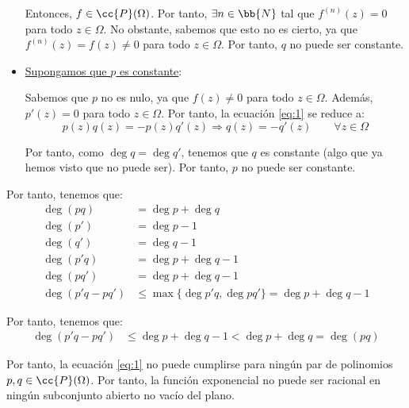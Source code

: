 \begin{ejercicio}
\begin{itemize}
        Entonces, $f\in \cc{P}(\Omega)$. Por tanto, $\exists n\in \bb{N}$ tal que $f^{(n)}(z)=0$ para todo $z\in\Omega$. No obstante, sabemos que esto no es cierto, ya que $f^{(n)}(z)=f(z)\neq 0$ para todo $z\in\Omega$. Por tanto, $q$ no puede ser constante.

        \item \ul{Supongamos que $p$ es constante}:
        
        Sabemos que $p$ no es nulo, ya que $f(z)\neq 0$ para todo $z\in\Omega$. Además, $p'(z)=0$ para todo $z\in\Omega$. Por tanto, la ecuación \eqref{eq:1} se reduce a:
        \begin{equation*}
            p(z)q(z) = -p(z)q'(z)
            \Longrightarrow
            q(z) = -q'(z)\qquad \forall z\in\Omega
        \end{equation*}

        Por tanto, como $\deg q=\deg q'$, tenemos que $q$ es constante (algo que ya hemos visto que no puede ser). Por tanto, $p$ no puede ser constante.
    \end{itemize}

    Por tanto, tenemos que:
    \begin{align*}
        \deg (pq) &= \deg p + \deg q\\
        \deg (p') &= \deg p - 1\\
        \deg (q') &= \deg q - 1\\
        \deg (p'q) &= \deg p + \deg q - 1\\
        \deg (pq') &= \deg p + \deg q - 1\\
        \deg (p'q-pq') &\leq \max\{\deg p'q,\deg pq'\} = \deg p + \deg q - 1
    \end{align*}

    Por tanto, tenemos que:
    \begin{align*}
        \deg (p'q-pq') &\leq \deg p + \deg q - 1 < \deg p + \deg q = \deg (pq)
    \end{align*}

    Por tanto, la ecuación \eqref{eq:1} no puede cumplirse para ningún par de polinomios $p,q\in\cc{P}(\Omega)$. Por tanto, la función exponencial no puede ser racional en ningún subconjunto abierto no vacío del plano.
\end{ejercicio}